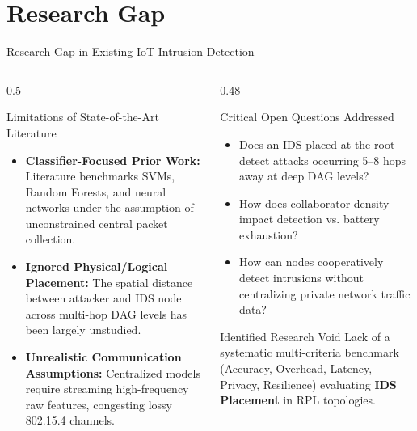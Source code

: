 \documentclass[aspectratio=169, 10pt]{beamer}
\begin{document}
\section{Research Gap}
\begin{frame}{Research Gap in Existing IoT Intrusion Detection}
  \begin{columns}[T]
    \begin{column}{0.5\textwidth}
      \begin{block}{Limitations of State-of-the-Art Literature}
        \begin{itemize}
          \item \textbf{Classifier-Focused Prior Work:} Literature benchmarks SVMs, Random Forests, and neural networks under the assumption of unconstrained central packet collection.
          \item \textbf{Ignored Physical/Logical Placement:} The spatial distance between attacker and IDS node across multi-hop DAG levels has been largely unstudied.
          \item \textbf{Unrealistic Communication Assumptions:} Centralized models require streaming high-frequency raw features, congesting lossy 802.15.4 channels.
        \end{itemize}
      \end{block}
    \end{column}
    \begin{column}{0.48\textwidth}
      \begin{block}{Critical Open Questions Addressed}
        \begin{itemize}
          \item Does an IDS placed at the root detect attacks occurring 5--8 hops away at deep DAG levels?
          \item How does collaborator density impact detection vs. battery exhaustion?
          \item How can nodes cooperatively detect intrusions without centralizing private network traffic data?
        \end{itemize}
      \end{block}
      \begin{alertblock}{Identified Research Void}
        Lack of a systematic multi-criteria benchmark (Accuracy, Overhead, Latency, Privacy, Resilience) evaluating \textbf{IDS Placement} in RPL topologies.
      \end{alertblock}
    \end{column}
  \end{columns}
\end{frame}
\end{document}

